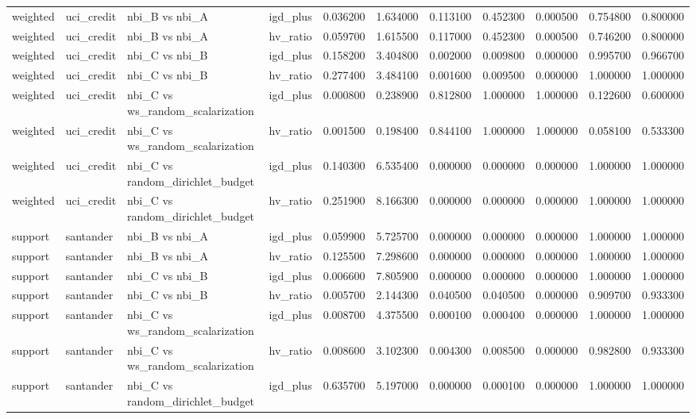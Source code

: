 \begin{landscape}
\begin{longtable}{llllrrrrrrr}
weighted & uci\_credit & nbi\_B vs nbi\_A & igd\_plus & 0.036200 & 1.634000 & 0.113100 & 0.452300 & 0.000500 & 0.754800 & 0.800000 \\
weighted & uci\_credit & nbi\_B vs nbi\_A & hv\_ratio & 0.059700 & 1.615500 & 0.117000 & 0.452300 & 0.000500 & 0.746200 & 0.800000 \\
weighted & uci\_credit & nbi\_C vs nbi\_B & igd\_plus & 0.158200 & 3.404800 & 0.002000 & 0.009800 & 0.000000 & 0.995700 & 0.966700 \\
weighted & uci\_credit & nbi\_C vs nbi\_B & hv\_ratio & 0.277400 & 3.484100 & 0.001600 & 0.009500 & 0.000000 & 1.000000 & 1.000000 \\
weighted & uci\_credit & nbi\_C vs ws\_random\_scalarization & igd\_plus & 0.000800 & 0.238900 & 0.812800 & 1.000000 & 1.000000 & 0.122600 & 0.600000 \\
weighted & uci\_credit & nbi\_C vs ws\_random\_scalarization & hv\_ratio & 0.001500 & 0.198400 & 0.844100 & 1.000000 & 1.000000 & 0.058100 & 0.533300 \\
weighted & uci\_credit & nbi\_C vs random\_dirichlet\_budget & igd\_plus & 0.140300 & 6.535400 & 0.000000 & 0.000000 & 0.000000 & 1.000000 & 1.000000 \\
weighted & uci\_credit & nbi\_C vs random\_dirichlet\_budget & hv\_ratio & 0.251900 & 8.166300 & 0.000000 & 0.000000 & 0.000000 & 1.000000 & 1.000000 \\
support & santander & nbi\_B vs nbi\_A & igd\_plus & 0.059900 & 5.725700 & 0.000000 & 0.000000 & 0.000000 & 1.000000 & 1.000000 \\
support & santander & nbi\_B vs nbi\_A & hv\_ratio & 0.125500 & 7.298600 & 0.000000 & 0.000000 & 0.000000 & 1.000000 & 1.000000 \\
support & santander & nbi\_C vs nbi\_B & igd\_plus & 0.006600 & 7.805900 & 0.000000 & 0.000000 & 0.000000 & 1.000000 & 1.000000 \\
support & santander & nbi\_C vs nbi\_B & hv\_ratio & 0.005700 & 2.144300 & 0.040500 & 0.040500 & 0.000000 & 0.909700 & 0.933300 \\
support & santander & nbi\_C vs ws\_random\_scalarization & igd\_plus & 0.008700 & 4.375500 & 0.000100 & 0.000400 & 0.000000 & 1.000000 & 1.000000 \\
support & santander & nbi\_C vs ws\_random\_scalarization & hv\_ratio & 0.008600 & 3.102300 & 0.004300 & 0.008500 & 0.000000 & 0.982800 & 0.933300 \\
support & santander & nbi\_C vs random\_dirichlet\_budget & igd\_plus & 0.635700 & 5.197000 & 0.000000 & 0.000100 & 0.000000 & 1.000000 & 1.000000 \\

\end{longtable}
\end{landscape}
